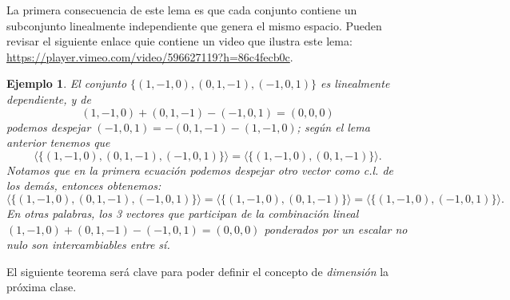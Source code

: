 \documentclass[12pt]{book}
\newtheorem{ejem}{Ejemplo}
\begin{document}
La primera consecuencia de este lema es que cada conjunto contiene un subconjunto linealmente independiente que genera el mismo espacio.
Pueden revisar el siguiente enlace quie contiene un video que ilustra este lema: \url{https://player.vimeo.com/video/596627119?h=86c4fecb0c}.

\begin{ejem} {\em
El conjunto $\{(1,-1,0),(0,1,-1),(-1,0,1)\}$ es linealmente dependiente, y de 
$$(1,-1,0)+(0,1,-1)-(-1,0,1)=(0,0,0)$$
podemos despejar $(-1,0,1)=-(0,1,-1)-(1,-1,0)$; según el lema anterior tenemos que 
$$\langle\{(1,-1,0),(0,1,-1),(-1,0,1)\}\rangle=\langle\{(1,-1,0),(0,1,-1)\}\rangle.$$
Notamos que en la primera ecuación podemos despejar otro vector como c.l. de los demás, entonces obtenemos:
$$\langle\{(1,-1,0),(0,1,-1),(-1,0,1)\}\rangle=\langle\{(1,-1,0),(0,1,-1)\}\rangle=\langle\{(1,-1,0),(-1,0,1)\}\rangle.$$
En otras palabras, los 3 vectores que participan de la combinación lineal $(1,-1,0)+(0,1,-1)-(-1,0,1)=(0,0,0)$ ponderados por un escalar no nulo son intercambiables entre sí.
}
\end{ejem}

El siguiente teorema será clave para poder definir el concepto de \emph{dimensión} la próxima clase.
\end{document}
